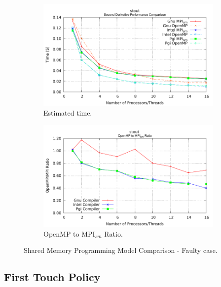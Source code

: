 \begin{figure} [h!]
    \centering
    \captionsetup{justification=centering, singlelinecheck=false}
    \begin{subfigure}{.6\textwidth}
      \centering
      \hspace*{-1.5cm} 
      \includegraphics[width=0.95\linewidth]{Plots/SMPM/stoutShowingEffectOfFirstTouch.pdf}
      \caption[]{Estimated time.}
      \label{fig:sharedMemoryComparison}
    \end{subfigure}%
    \begin{subfigure}{.6\textwidth}
      \centering
      \hspace*{-1.5cm} 
      \includegraphics[width=0.95\linewidth]{Plots/SMPM/stoutRatioShowingEffectOfFirstTouch.pdf}
      \caption{OpenMP to MPI$_{sm}$ Ratio.}
      \label{fig:sharedMemoryRatioComparison}
    \end{subfigure}%
\caption{Shared Memory Programming Model Comparison - Faulty case.}
\label{fig:sharedMemoryProgrammingModel}
\end{figure}


\subsection*{First Touch Policy}

